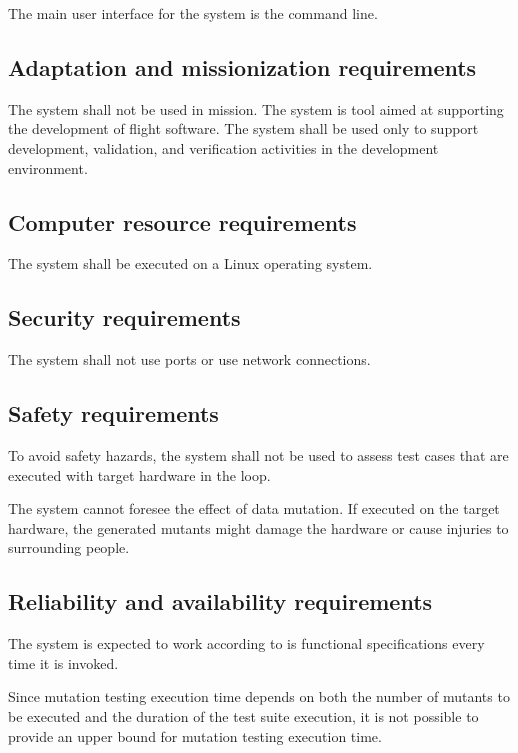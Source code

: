 \RQ{} The main user interface for the system is the command line.

\subsection{Adaptation and missionization requirements}

\RQ{} The system shall not be used in mission. The system is tool aimed at supporting the development of flight software. The system shall be used only to support development, validation, and verification activities in the development environment. 

\subsection{Computer resource requirements}

\RQ{} The system shall be executed on a Linux operating system.

\subsection{Security requirements }

\RQ{} The system shall not use ports or use network connections.


\subsection{Safety requirements}

\RQ{} To avoid safety hazards, the system shall not be used to assess test cases that are executed with target hardware in the loop.

\RQ{} The system cannot foresee the effect of data mutation. If executed on the target hardware, the generated mutants might damage the hardware or cause injuries to surrounding people.

\subsection{Reliability and availability requirements}

\RQ{} The system is expected to work according to is functional specifications every time it is invoked.

\RQ{} Since mutation testing execution time depends on both the number of mutants to be executed and the duration of the test suite execution, it is not possible to provide an upper bound for mutation testing execution time.

